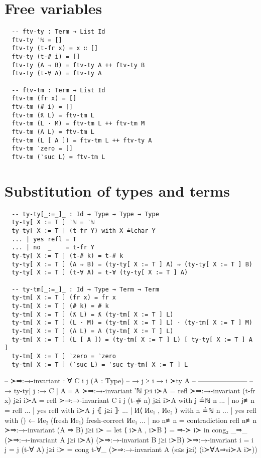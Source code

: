 \documentclass[logo,bsc,singlespacing,parskip,online]{infthesis}
\begin{document}
\section{Free variables}
\label{appendix:f_free_variables}
\begin{verbatim}
  -- ftv-ty : Term → List Id
  ftv-ty ‵ℕ = []
  ftv-ty (t-fr x) = x ∷ []
  ftv-ty (t-# i) = []
  ftv-ty (A ⇒ B) = ftv-ty A ++ ftv-ty B
  ftv-ty (t-∀ A) = ftv-ty A

  -- ftv-tm : Term → List Id
  ftv-tm (fr x) = []
  ftv-tm (# i) = []
  ftv-tm (ƛ L) = ftv-tm L
  ftv-tm (L · M) = ftv-tm L ++ ftv-tm M
  ftv-tm (Λ L) = ftv-tm L
  ftv-tm (L [ A ]) = ftv-tm L ++ ftv-ty A
  ftv-tm ‵zero = []
  ftv-tm (‵suc L) = ftv-tm L
\end{verbatim}

\section{Substitution of types and terms}
\label{appendix:f_substitution_of_terms}
\begin{verbatim}
  -- ty-ty[_:=_]_ : Id → Type → Type → Type
  ty-ty[ X := T ] ‵ℕ = ‵ℕ
  ty-ty[ X := T ] (t-fr Y) with X ≟lchar Y
  ... | yes refl = T
  ... | no  _    = t-fr Y
  ty-ty[ X := T ] (t-# k) = t-# k
  ty-ty[ X := T ] (A ⇒ B) = (ty-ty[ X := T ] A) ⇒ (ty-ty[ X := T ] B)
  ty-ty[ X := T ] (t-∀ A) = t-∀ (ty-ty[ X := T ] A)

  -- ty-tm[_:=_]_ : Id → Type → Term → Term
  ty-tm[ X := T ] (fr x) = fr x
  ty-tm[ X := T ] (# k) = # k
  ty-tm[ X := T ] (ƛ L) = ƛ (ty-tm[ X := T ] L)
  ty-tm[ X := T ] (L · M) = (ty-tm[ X := T ] L) · (ty-tm[ X := T ] M)
  ty-tm[ X := T ] (Λ L) = Λ (ty-tm[ X := T ] L)
  ty-tm[ X := T ] (L [ A ]) = (ty-tm[ X := T ] L) [ ty-ty[ X := T ] A ]
  ty-tm[ X := T ] ‵zero = ‵zero
  ty-tm[ X := T ] (‵suc L) = ‵suc ty-tm[ X := T ] L
\end{verbatim}

\begin{code}
  -- ≻⇒:→-invariant : ∀ {C i j} (A : Type)
  --   → j ≥ i       → i ≻ty A
  --     ---------------------
  --   → ty-ty[ j :→ C ] A ≡ A
  ≻⇒:→-invariant ‵ℕ j≥i i≻A = refl
  ≻⇒:→-invariant (t-fr x) j≥i i≻A = refl
  ≻⇒:→-invariant {C} {i} {j} (t-# n) j≥i i≻A with j ≟ℕ n
  ... | no  j≢n  = refl
  ... | yes refl with i≻A j ⦃ j≥i ⦄
  ...   | И⟨ Иe₁ , Иe₂ ⟩ with n ≟ℕ n
  ...     | yes refl with () ← Иe₂ (fresh Иe₁) {fresh-correct Иe₁}
  ...     | no  n≢n  = contradiction refl n≢n
  ≻⇒:→-invariant (A ⇒ B) j≥i i≻ = let ⟨ i≻A , i≻B ⟩ = ⇒-≻ i≻
    in cong₂ _⇒_ (≻⇒:→-invariant A j≥i i≻A) (≻⇒:→-invariant B j≥i i≻B)
  ≻⇒:→-invariant {i = i} {j = j} (t-∀ A) j≥i i≻ = cong t-∀_
    (≻⇒:→-invariant A (s≤s j≥i) (i≻∀A⇒si≻A i≻))
\end{code}
\end{document}
